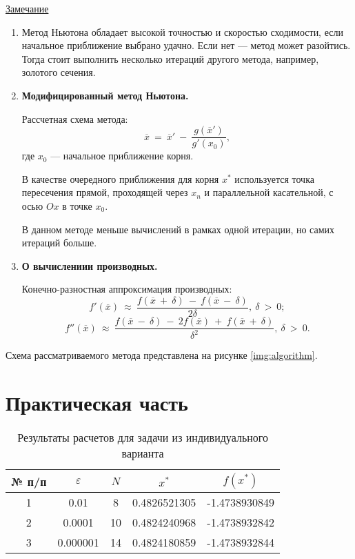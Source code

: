 \documentclass{bmstu}
\begin{document}
\underline{Замечание}
\begin{enumerate}
    \item Метод Ньютона обладает высокой точностью и скоростью сходимости, если начальное приближение выбрано удачно. Если нет --- метод может разойтись. Тогда стоит выполнить несколько итераций другого метода, например, золотого сечения.
    \item \textbf{Модифицированный метод Ньютона.}
    
        Рассчетная схема метода:
        \begin{equation}
            \overline{x} \ = \ \overline{x}' \ - \ \frac{g(\overline{x}')}{g'(x_0)},
        \end{equation}
        где $x_0$ --- начальное приближение корня.

        В качестве очередного приближения для корня $x^*$ используется точка пересечения прямой, проходящей через $x_n$ и параллельной касательной, с осью $Ox$ в точке $x_0$.

        В данном методе меньше вычислений в рамках одной итерации, но самих итераций больше.
    \item \textbf{О вычислениии производных.}
        
        Конечно-разностная аппроксимация производных:
        \begin{equation}
            f'(\overline{x}) \ \approx \ \frac{f(\overline{x} \ + \ \delta) \ - \ f(\overline{x} \ - \ \delta)}{2 \delta}, \ \delta \ > \ 0;
        \end{equation}
        \begin{equation}
            f''(\overline{x}) \ \approx \ \frac{f(\overline{x} \ - \ \delta) \ - \ 2f(\overline{x}) \ + \ f(\overline{x} \ + \ \delta)}{\delta^2}, \ \delta \ > \ 0.
        \end{equation}
\end{enumerate}

Схема рассматриваемого метода представлена на рисунке \ref{img:algorithm}. 



\chapter{Практическая часть}

\begin{table}[H]
    \centering
	\caption{Результаты расчетов для задачи из индивидуального варианта}
    \label{tbl:task}
	\begin{tabular}{|c|c|c|c|c|}
        \hline
        № п/п & $\varepsilon$ & $N$ & $x^*$ & $f(x^*)$ \\ \hline
        1 & 0.01 & 8 & 0.4826521305 & -1.4738930849 \\ \hline
        2 & 0.0001 & 10 & 0.4824240968 & -1.4738932842 \\ \hline
        3 & 0.000001 & 14 & 0.4824180859 & -1.4738932844 \\ \hline
    \end{tabular}
\end{table}
\end{document}
